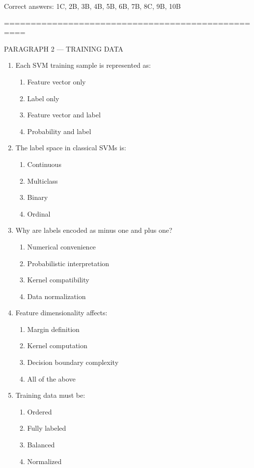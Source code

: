 \documentclass{article}
\begin{document}
	Correct answers: 1C, 2B, 3B, 4B, 5B, 6B, 7B, 8C, 9B, 10B
	
	\bigskip
	==================================================
	
	PARAGRAPH 2 — TRAINING DATA
	
	\begin{enumerate}
		\item Each SVM training sample is represented as:
		\begin{enumerate}
			\item Feature vector only
			\item Label only
			\item Feature vector and label
			\item Probability and label
		\end{enumerate}
		
		\item The label space in classical SVMs is:
		\begin{enumerate}
			\item Continuous
			\item Multiclass
			\item Binary
			\item Ordinal
		\end{enumerate}
		
		\item Why are labels encoded as minus one and plus one?
		\begin{enumerate}
			\item Numerical convenience
			\item Probabilistic interpretation
			\item Kernel compatibility
			\item Data normalization
		\end{enumerate}
		
		\item Feature dimensionality affects:
		\begin{enumerate}
			\item Margin definition
			\item Kernel computation
			\item Decision boundary complexity
			\item All of the above
		\end{enumerate}
		
		\item Training data must be:
		\begin{enumerate}
			\item Ordered
			\item Fully labeled
			\item Balanced
			\item Normalized
		\end{enumerate}
		

\end{enumerate}
\end{document}
